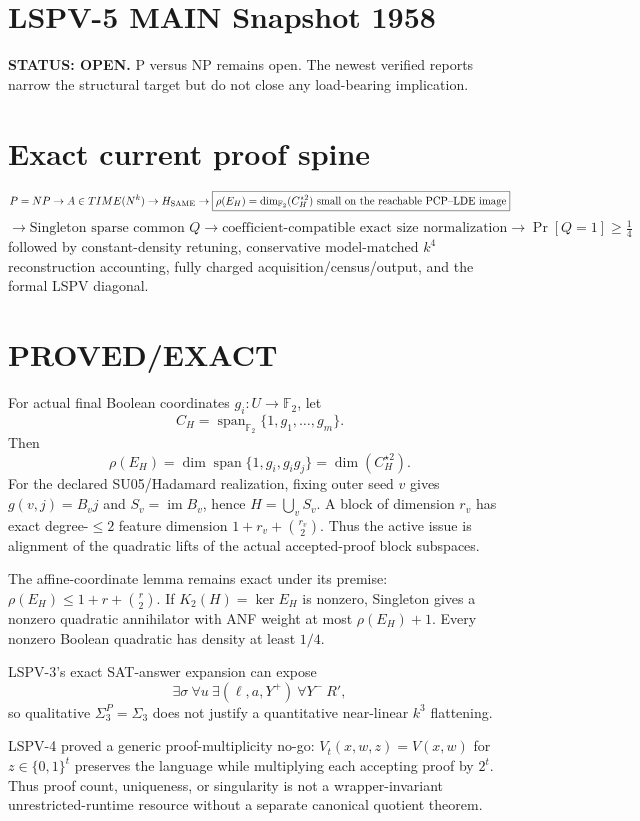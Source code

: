 \documentclass[11pt]{article}
\begin{document}
\section*{LSPV-5 MAIN Snapshot 1958}
\textbf{STATUS: OPEN.} P versus NP remains open. The newest verified reports narrow the structural target but do not close any load-bearing implication.

\section*{Exact current proof spine}
\[
P=NP\to A\in TIME(N^k)\to H_{\rm SAME}
\to \boxed{\rho(E_H)=\dim_{\mathbb F_2}(C_H^{\star2})\text{ small on the reachable PCP--LDE image}}
\]
\[
\to \text{Singleton sparse common }Q
\to \boxed{\text{coefficient-compatible exact size normalization}}
\to \Pr[Q=1]\ge\tfrac14
\]
followed by constant-density retuning, conservative model-matched $k^4$ reconstruction accounting, fully charged acquisition/census/output, and the formal LSPV diagonal.

\section*{PROVED/EXACT}
For actual final Boolean coordinates $g_i:U\to\mathbb F_2$, let
\[
C_H=\operatorname{span}_{\mathbb F_2}\{1,g_1,\ldots,g_m\}.
\]
Then
\[
\rho(E_H)=\dim\operatorname{span}\{1,g_i,g_i g_j\}=\dim(C_H^{\star2}).
\]
For the declared SU05/Hadamard realization, fixing outer seed $v$ gives $g(v,j)=B_vj$ and $S_v=\operatorname{im}B_v$, hence $H=\bigcup_vS_v$. A block of dimension $r_v$ has exact degree-$\le2$ feature dimension $1+r_v+\binom{r_v}{2}$. Thus the active issue is alignment of the quadratic lifts of the actual accepted-proof block subspaces.

The affine-coordinate lemma remains exact under its premise: $\rho(E_H)\le1+r+\binom r2$. If $K_2(H)=\ker E_H$ is nonzero, Singleton gives a nonzero quadratic annihilator with ANF weight at most $\rho(E_H)+1$. Every nonzero Boolean quadratic has density at least $1/4$.

LSPV-3's exact SAT-answer expansion can expose
\[
\exists\sigma\ \forall u\ \exists(\ell,a,Y^+)\ \forall Y^-\ R',
\]
so qualitative $\Sigma_3^P=\Sigma_3$ does not justify a quantitative near-linear $k^3$ flattening.

LSPV-4 proved a generic proof-multiplicity no-go: $V_t(x,w,z)=V(x,w)$ for $z\in\{0,1\}^t$ preserves the language while multiplying each accepting proof by $2^t$. Thus proof count, uniqueness, or singularity is not a wrapper-invariant unrestricted-runtime resource without a separate canonical quotient theorem.
\end{document}
